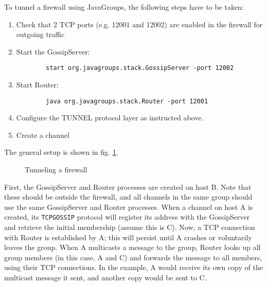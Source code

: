       To tunnel a firewall using JavaGroups, the following steps have to be taken:

      \begin{enumerate}

      \item Check that 2 TCP ports (e.g. 12001 and 12002) are enabled in the firewall
            for outgoing traffic
      \item Start the GossipServer:
        \begin{small}
	\begin{verbatim}
        start org.javagroups.stack.GossipServer -port 12002
      \end{verbatim}
      \end{small}


      \item Start Router:
        \begin{small}
	\begin{verbatim}
        java org.javagroups.stack.Router -port 12001
      \end{verbatim}
      \end{small}


      \item Configure the TUNNEL protocol layer as instructed above.

      \item Create a channel

      \end{enumerate}


      The general setup is shown in fig. \ref{TunnelingFig}.

      \begin{figure}[htb]
      \caption{Tunneling a firewall}
      \label{TunnelingFig}
      \end{figure}

      First, the GossipServer and Router processes are created on host B. Note that
      these should be outside the firewall, and all channels in the same group should
      use the same GossipServer and Router processes. When a channel on host A is
      created, its {\tt TCPGOSSIP} protocol will register its address with the
      GossipServer and retrieve the initial membership (assume this is C). Now, a TCP
      connection with Router is established by A; this will persist until A crashes
      or voluntarily leaves the group. When A multicasts a message to the group,
      Router looks up all group members (in this case, A and C) and forwards the
      message to all members, using their TCP connections. In the example, A would
      receive its own copy of the multicast message it sent, and another copy would
      be sent to C.
	
